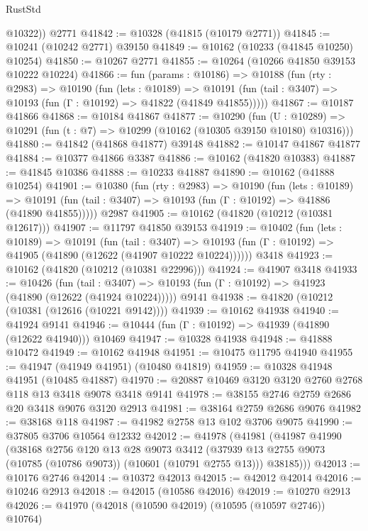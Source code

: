 \begin{lexlean}{RustStd}
\begin{coremodule}
        @10322))
    @2771
@41842 := @10328 (@41815 (@10179 @2771))
@41845 := @10241 (@10242 @2771) @39150
@41849 := @10162 (@10233 (@41845 @10250) @10254)
@41850 := @10267 @2771
@41855 := @10264 (@10266 @41850 @39153 @10222 @10224)
@41866 := fun (params : @10186) =>
  @10188
    (fun (rty : @2983) =>
    @10190
      (fun (lets : @10189) =>
      @10191 (fun (tail : @3407) => @10193 (fun (Γ : @10192) => @41822 (@41849 @41855)))))
@41867 := @10187 @41866
@41868 := @10184 @41867
@41877 := @10290
    (fun (U : @10289) => @10291 (fun (t : @7) => @10299 (@10162 (@10305 @39150 @10180) @10316)))
@41880 := @41842 (@41868 @41877) @39148
@41882 := @10147 @41867 @41877
@41884 := @10377 @41866 @3387
@41886 := @10162 (@41820 @10383)
@41887 := @41845 @10386
@41888 := @10233 @41887
@41890 := @10162 (@41888 @10254)
@41901 := @10380
    (fun (rty : @2983) =>
    @10190
      (fun (lets : @10189) =>
      @10191 (fun (tail : @3407) => @10193 (fun (Γ : @10192) => @41886 (@41890 @41855)))))
    @2987
@41905 := @10162 (@41820 (@10212 (@10381 @12617)))
@41907 := @11797 @41850 @39153
@41919 := @10402
    (fun (lets : @10189) =>
    @10191
      (fun (tail : @3407) =>
      @10193 (fun (Γ : @10192) => @41905 (@41890 (@12622 (@41907 @10222 @10224))))))
    @3418
@41923 := @10162 (@41820 (@10212 (@10381 @22996)))
@41924 := @41907 @3418
@41933 := @10426
    (fun (tail : @3407) => @10193 (fun (Γ : @10192) => @41923 (@41890 (@12622 (@41924 @10224)))))
    @9141
@41938 := @41820 (@10212 (@10381 (@12616 (@10221 @9142))))
@41939 := @10162 @41938
@41940 := @41924 @9141
@41946 := @10444 (fun (Γ : @10192) => @41939 (@41890 (@12622 @41940))) @10469
@41947 := @10328 @41938
@41948 := @41888 @10472
@41949 := @10162 @41948
@41951 := @10475 @11795 @41940
@41955 := @41947 (@41949 @41951) (@10480 @41819)
@41959 := @10328 @41948 @41951 (@10485 @41887)
@41970 := @20887 @10469 @3120 @3120 @2760 @2768 @118 @13 @3418 @9078 @3418 @9141
@41978 := @38155 @2746 @2759 @2686 @20 @3418 @9076 @3120 @2913
@41981 := @38164 @2759 @2686 @9076
@41982 := @38168 @118
@41987 := @41982 @2758 @13 @102 @3706 @9075
@41990 := @37805 @3706 @10564 @12332
@42012 := @41978
    (@41981
      (@41987
        @41990
        (@38168
          @2756
          @120
          @13
          @28
          @9073
          @3412
          (@37939 @13 @2755 @9073 (@10785 (@10786 @9073)) (@10601 (@10791 @2755 @13)))
          @38185)))
@42013 := @10176 @2746
@42014 := @10372 @42013
@42015 := @42012 @42014
@42016 := @10246 @2913
@42018 := @42015 (@10586 @42016)
@42019 := @10270 @2913
@42026 := @41970 (@42018 (@10590 @42019) (@10595 (@10597 @2746)) @10764)

\end{coremodule}
\end{lexlean}
